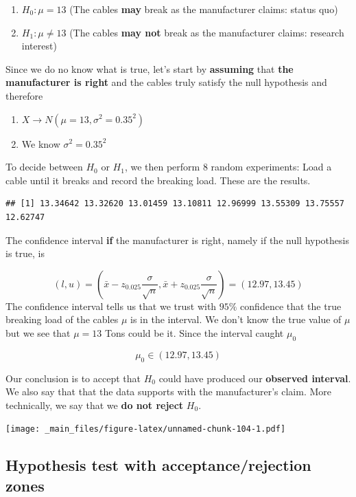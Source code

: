 \documentclass[
]{book}
\providecommand{\tightlist}{%
  \setlength{\itemsep}{0pt}\setlength{\parskip}{0pt}}
\begin{document}
\begin{enumerate}
\def\labelenumi{\alph{enumi}.}
\tightlist
\item
  \(H_0:\mu = 13\) (The cables \textbf{may} break as the manufacturer claims: status quo)
\item
  \(H_1:\mu \neq 13\) (The cables \textbf{may not} break as the manufacturer claims: research interest)
\end{enumerate}

Since we do no know what is true, let's start by \textbf{assuming} that \textbf{the manufacturer is right} and the cables truly satisfy the null hypothesis and therefore

\begin{enumerate}
\def\labelenumi{\arabic{enumi}.}
\tightlist
\item
  \(X \rightarrow N(\mu=13, \sigma^2=0.35^2)\)
\item
  We know \(\sigma^2=0.35^2\)
\end{enumerate}

To decide between \(H_0\) or \(H_1\), we then perform \(8\) random experiments: Load a cable until it breaks and record the breaking load. These are the results.

\begin{verbatim}
## [1] 13.34642 13.32620 13.01459 13.10811 12.96999 13.55309 13.75557 12.62747
\end{verbatim}

The confidence interval \textbf{if} the manufacturer is right, namely if the null hypothesis is true, is

\[(l,u)=(\bar{x}-z_{0.025} \frac{\sigma}{\sqrt{n}}, \bar{x}+z_{0.025} \frac{\sigma}{\sqrt{n}})= (12.97,13.45)\]
The confidence interval tells us that we trust with \(95\%\) confidence that the true breaking load of the cables \(\mu\) is in the interval. We don't know the true value of \(\mu\) but we see that \(\mu=13\) Tons could be it. Since the interval caught \(\mu_0\)

\[\mu_0\in (12.97,13.45)\]

Our conclusion is to accept that \(H_0\) could have produced our \textbf{observed interval}. We also say that that the data supports with the manufacturer's claim. More technically, we say that we \textbf{do not reject} \(H_0\).

\texttt{[image: \_main\_files/figure-latex/unnamed-chunk-104-1.pdf]}

\hypertarget{hypothesis-test-with-acceptancerejection-zones}{%
\subsection{Hypothesis test with acceptance/rejection zones}\label{hypothesis-test-with-acceptancerejection-zones}}
\end{document}

